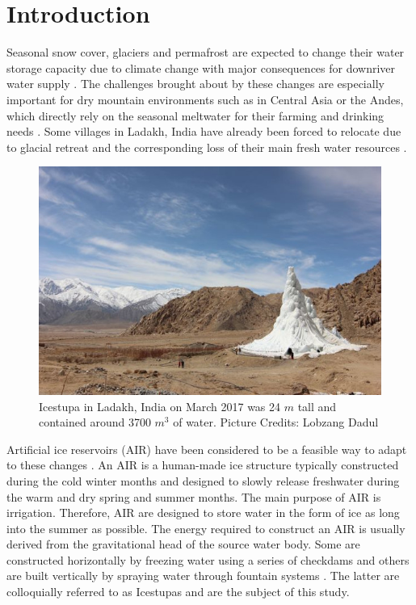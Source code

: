 \documentclass[utf8]{frontiersSCNS} %
\begin{document}
\section{Introduction}

Seasonal snow cover, glaciers and permafrost are expected to change their water storage capacity due to climate change
with major consequences for downriver water supply \citep{Immerzeel_2020}. The challenges brought about by these
changes are especially important for dry mountain environments such as in Central Asia or the Andes, which directly
rely on the seasonal meltwater for their farming and drinking needs \citep{HoelzleBarandun_2019, Apel_2018,
Buytaert_2017, Chen_2016, UNGERSHAYESTEH_2013}. Some villages in Ladakh, India have already been forced to relocate
due to glacial retreat and the corresponding loss of their main fresh water resources \citep{zanskar}. 

\begin{figure} \begin{center} \includegraphics[width=10 cm]{Figures/Figure_1.jpg}
\end{center} \caption{Icestupa in Ladakh, India on March 2017 was 24 $m$ tall and contained around 3700 $m^3$ 
of water. Picture Credits: Lobzang Dadul} \label{fig:cone} \end{figure}

Artificial ice reservoirs (AIR) have been considered to be a feasible way to adapt to these changes \citep{IPCC_2019,
10.1659/MRD-JOURNAL-D-18-00072.1}. An AIR is a human-made ice structure typically constructed during the cold winter
months and designed to slowly release freshwater during the warm and dry spring and summer months. The main purpose of
AIR is irrigation. Therefore, AIR are designed to store water in the form of ice as long into the summer as possible.
The energy required to construct an AIR is usually derived from the gravitational head of the source water body. Some
are constructed horizontally by freezing water using a series of checkdams and others are built vertically by spraying
water through fountain systems \citep{Nusser_2018}. The latter are colloquially referred to as Icestupas and are the
subject of this study.
\end{document}
